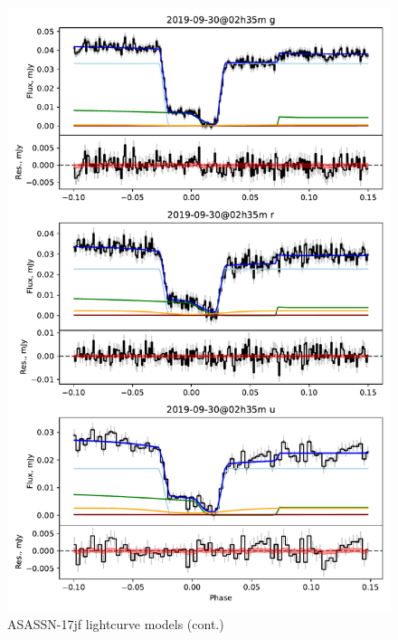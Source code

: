 \begin{figure}
    \centering
    \includegraphics[width=\textwidth]{figures/results/three_cvs_with_weird_colours/ASASSN-17jf/ASASSN-17jf_2.pdf}
    \caption{ASASSN-17jf lightcurve models (cont.)}
    \label{fig:ASASSN-17jf all lightcurves cont 1}
\end{figure}
